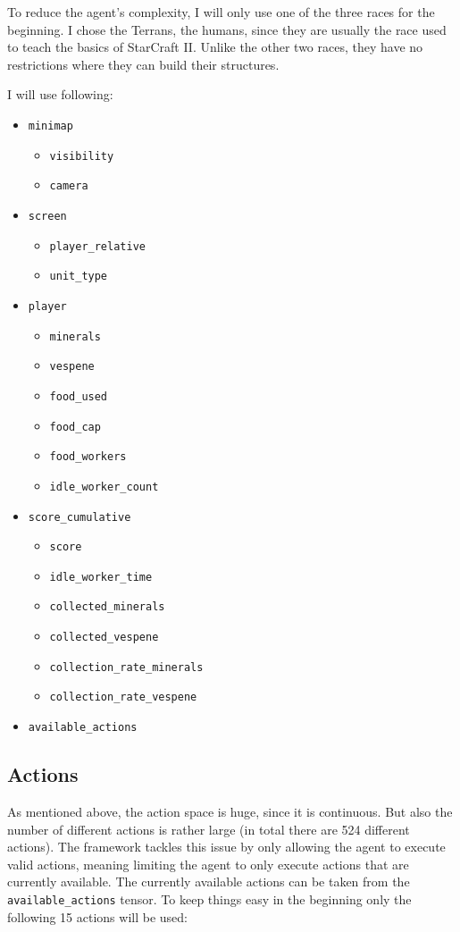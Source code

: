 \documentclass{article}
\begin{document}
To reduce the agent's complexity, I will only use one of the three races for 
the beginning. I chose the Terrans, the humans, since they are usually the race 
used to teach the basics of StarCraft II. Unlike the other two races, they have 
no restrictions where they can build their structures. 

I will use following:
\begin{itemize}[noitemsep]
\item \texttt{minimap}
\begin{itemize}[noitemsep]
	\item \texttt{visibility}
	\item \texttt{camera}
\end{itemize}
\item \texttt{screen}
\begin{itemize}[noitemsep]
	\item \texttt{player\_relative}
	\item \texttt{unit\_type}
\end{itemize}
\item \texttt{player}
\begin{itemize}[noitemsep]
	\item \texttt{minerals}
	\item \texttt{vespene}
	\item \texttt{food\_used}
	\item \texttt{food\_cap}
	\item \texttt{food\_workers}
	\item \texttt{idle\_worker\_count}
\end{itemize}
\item \texttt{score\_cumulative}
\begin{itemize}[noitemsep]
	\item \texttt{score}
	\item \texttt{idle\_worker\_time}
	\item \texttt{collected\_minerals}
	\item \texttt{collected\_vespene}
	\item \texttt{collection\_rate\_minerals}
	\item \texttt{collection\_rate\_vespene}
\end{itemize}
\item \texttt{available\_actions}
\end{itemize}


\subsection{Actions}
As mentioned above, the action space is huge, since it is continuous. But also 
the number of different actions is rather large (in total there are 524 
different actions). The framework tackles this issue by only allowing the agent 
to execute valid actions, meaning limiting the agent to only execute actions 
that are currently available. The currently available actions can be taken from 
the \texttt{available\_actions} tensor. To keep things easy in the beginning 
only the following 15 actions will be used:
\end{document}
